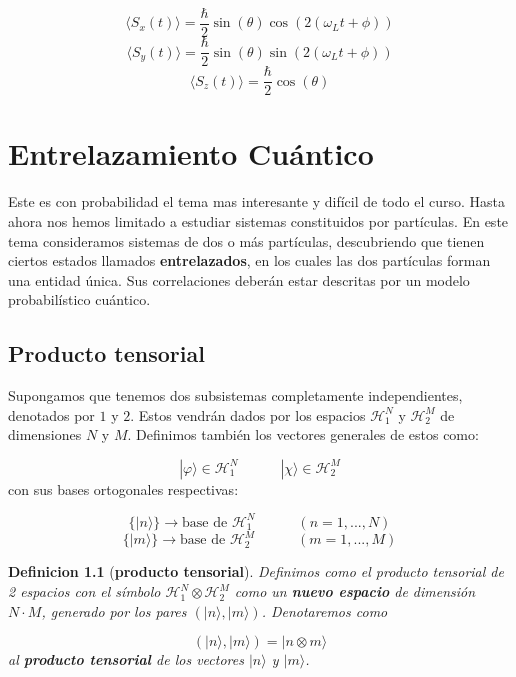 \documentclass[12pt,a4paper]{book}
\numberwithin{equation}{chapter}
\numberwithin{figure}{chapter}
\newcommand{\tquad}{\quad \quad \quad}
\newcommand{\Hcal}{\mathcal{H}}
\newtheorem{definition}{Definicion}[section]
\begin{document}
\begin{equation}
\langle S_x  (t) \rangle = \frac{\hbar}{2} \sin (\theta) \cos (2 (\omega_L t + \phi) ) 
\end{equation}
\begin{equation}
\langle S_y (t) \rangle = \frac{\hbar}{2} \sin (\theta) \sin (2 (\omega_L t + \phi) ) 
\end{equation}
\begin{equation}
\langle S_z (t) \rangle = \frac{\hbar}{2} \cos (\theta) 
\end{equation}
\newpage

\chapter{Entrelazamiento Cuántico}

Este es con probabilidad el tema mas interesante y difícil de todo el curso. Hasta ahora nos hemos limitado a estudiar sistemas constituidos por partículas. En este tema consideramos sistemas de dos o más partículas, descubriendo que tienen ciertos estados llamados \textbf{entrelazados}, en los cuales las dos partículas forman una entidad única. Sus correlaciones deberán estar descritas por un modelo probabilístico cuántico. \\

\section{Producto tensorial}

Supongamos que tenemos dos subsistemas completamente independientes, denotados por $1$ y $2$. Estos vendrán dados por los espacios $\mathcal{H}_1^N$ y $\mathcal{H}_2^M$ de dimensiones $N$ y $M$. Definimos también los vectores generales de estos como:

\begin{equation}
| \varphi \rangle \in \mathcal{H}_1^N \tquad | \chi \rangle \in \mathcal{H}_2^M
\end{equation}
con sus bases ortogonales respectivas:

\begin{equation}
\{ | n \rangle  \} \rightarrow \text{base de } \mathcal{H}_1^N \tquad (n=1,...,N) 
\end{equation}
\begin{equation}
\{ | m \rangle  \} \rightarrow \text{base de } \mathcal{H}_2^M \tquad (m=1,...,M) 
\end{equation} 

\begin{definition}[\textbf{producto tensorial}] Definimos como el producto tensorial de 2 espacios con el símbolo $\Hcal_1^N  \otimes \Hcal_2^M$ como un \textbf{ nuevo espacio} de dimensión $N\cdot M$, generado por los pares $(|n\rangle,|m\rangle)$. Denotaremos como

\begin{equation}
(|n\rangle,|m\rangle) = |n\otimes m\rangle
\end{equation}
al \textbf{producto tensorial} de los vectores $|n\rangle$ y $|m\rangle$.  \\
\end{definition}
\end{document}
